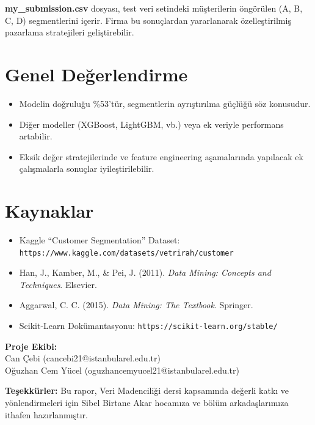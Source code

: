 \documentclass{article}
\begin{document}
\textbf{my\_submission.csv} dosyası, test veri setindeki müşterilerin öngörülen (A, B, C, D) segmentlerini içerir. Firma bu sonuçlardan yararlanarak özelleştirilmiş pazarlama stratejileri geliştirebilir.

\section{Genel Değerlendirme}

\begin{itemize}
    \item Modelin doğruluğu \%53’tür, segmentlerin ayrıştırılma güçlüğü söz konusudur.
    \item Diğer modeller (XGBoost, LightGBM, vb.) veya ek veriyle performans artabilir.
    \item Eksik değer stratejilerinde ve feature engineering aşamalarında yapılacak ek çalışmalarla sonuçlar iyileştirilebilir.
\end{itemize}

\section*{Kaynaklar}
\begin{itemize}
    \item Kaggle “Customer Segmentation” Dataset: \newline \texttt{https://www.kaggle.com/datasets/vetrirah/customer}
    \item Han, J., Kamber, M., \& Pei, J. (2011). \textit{Data Mining: Concepts and Techniques}. Elsevier.
    \item Aggarwal, C. C. (2015). \textit{Data Mining: The Textbook}. Springer.
    \item Scikit-Learn Dokümantasyonu: \texttt{https://scikit-learn.org/stable/}
\end{itemize}

\vspace{15pt}
\noindent
\textbf{Proje Ekibi:}\\
Can Çebi (cancebi21@istanbularel.edu.tr)\\
Oğuzhan Cem Yücel (oguzhancemyucel21@istanbularel.edu.tr)

\vspace{10pt}
\noindent
\textbf{Teşekkürler:} Bu rapor, Veri Madenciliği dersi kapsamında değerli katkı ve yönlendirmeleri için Sibel Birtane Akar hocamıza ve bölüm arkadaşlarımıza ithafen hazırlanmıştır.
\end{document}
